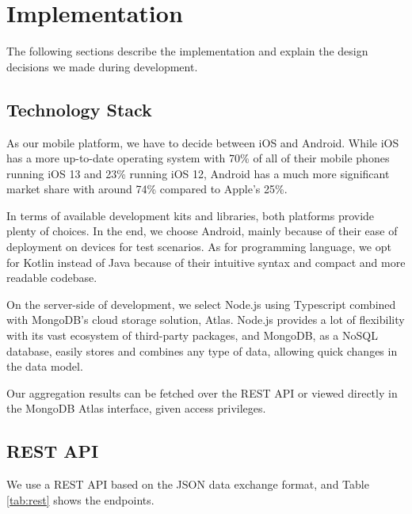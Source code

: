 
\chapter{Implementation}\label{chapter:implementation}

The following sections describe the implementation and explain the design decisions we made during development. 

\section{Technology Stack}

As our mobile platform, we have to decide between iOS and Android. While iOS has a more up-to-date operating system with 70\% of all of their mobile phones running iOS 13 and 23\% running iOS 12, Android has a much more significant market share with around 74\% compared to Apple's 25\%\cite{android1}\cite{android2}.

In terms of available development kits and libraries, both platforms provide plenty of choices. In the end, we choose Android, mainly because of their ease of deployment on devices for test scenarios. As for programming language, we opt for Kotlin instead of Java because of their intuitive syntax and compact and more readable codebase.

On the server-side of development, we select Node.js \cite{node} using Typescript combined with MongoDB's \cite{mongo} cloud storage solution, Atlas. Node.js provides a lot of flexibility with its vast ecosystem of third-party packages, and MongoDB, as a NoSQL database, easily stores and combines any type of data, allowing quick changes in the data model.

Our aggregation results can be fetched over the REST API or viewed directly in the MongoDB Atlas interface, given access privileges.

\section{REST API}
\label{sec:api}
We use a REST API based on the JSON data exchange format, and Table \ref{tab:rest} shows the endpoints.

